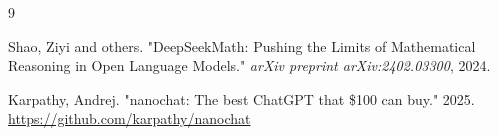 \begin{thebibliography}{9}

Shao, Ziyi and others. 
"DeepSeekMath: Pushing the Limits of Mathematical Reasoning in Open Language Models." 
\textit{arXiv preprint arXiv:2402.03300}, 2024.

Karpathy, Andrej. 
"nanochat: The best ChatGPT that \$100 can buy." 
2025. \url{https://github.com/karpathy/nanochat}

\end{thebibliography}
